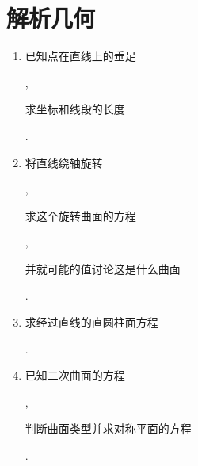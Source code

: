 \documentclass[10pt]{article}
\begin{document}
\section{解析几何}
\begin{enumerate}
  \item \begin{CJK}{UTF8}{mj}已知点在直线上的垂足\end{CJK}, \begin{CJK}{UTF8}{mj}求坐标和线段的长度\end{CJK}.

  \item \begin{CJK}{UTF8}{mj}将直线绕轴旋转\end{CJK}, \begin{CJK}{UTF8}{mj}求这个旋转曲面的方程\end{CJK}, \begin{CJK}{UTF8}{mj}并就可能的值讨论这是什么曲面\end{CJK}.

  \item \begin{CJK}{UTF8}{mj}求经过直线的直圆柱面方程\end{CJK}.

  \item \begin{CJK}{UTF8}{mj}已知二次曲面的方程\end{CJK}, \begin{CJK}{UTF8}{mj}判断曲面类型并求对称平面的方程\end{CJK}.

\end{enumerate}
\end{document}
